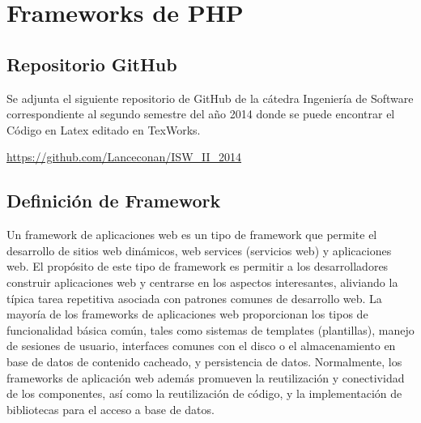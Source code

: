 
\section{Frameworks de PHP}

\subsection{Repositorio GitHub}

Se adjunta el siguiente repositorio de GitHub de la cátedra Ingeniería de Software correspondiente al segundo semestre del año 2014 donde se puede encontrar el Código en Latex editado en TexWorks. 

{\centerline{\url{https://github.com/Lanceconan/ISW_II_2014}}}

\subsection{Definición de Framework}

Un framework de aplicaciones web es un tipo de framework que permite el desarrollo de sitios web dinámicos, web services (servicios web) y aplicaciones web. El propósito de este tipo de framework es permitir a los desarrolladores construir aplicaciones web y centrarse en los aspectos interesantes, aliviando la típica tarea repetitiva asociada con patrones comunes de desarrollo web. La mayoría de los frameworks de aplicaciones web proporcionan los tipos de funcionalidad básica común, tales como sistemas de templates (plantillas), manejo de sesiones de usuario, interfaces comunes con el disco o el almacenamiento en base de datos de contenido cacheado, y persistencia de datos. Normalmente, los frameworks de aplicación web además promueven la reutilización y conectividad de los componentes, así como la reutilización de código, y la implementación de bibliotecas para el acceso a base de datos.\\

